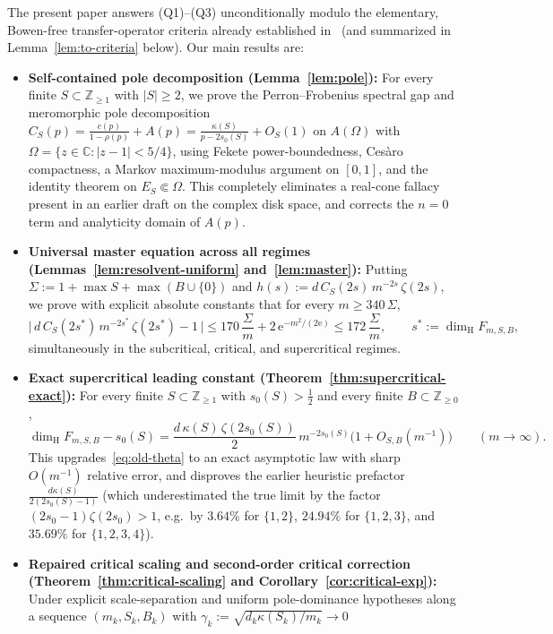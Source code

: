 \documentclass[11pt]{article}
\theoremstyle{definition}
\theoremstyle{remark}
\newcommand{\Z}{\mathbb{Z}}
\newcommand{\C}{\mathbb{C}}
\newcommand{\ee}{\mathrm{e}}
\newcommand{\dimH}{\dim_{\mathrm{H}}}
\begin{document}
The present paper answers (Q1)--(Q3) unconditionally modulo the elementary,
Bowen-free transfer-operator criteria already established in~\cite{Paper2}
(and summarized in Lemma~\ref{lem:to-criteria} below). Our main results are:
\begin{itemize}[leftmargin=1.6em]
\item \textbf{Self-contained pole decomposition (Lemma~\ref{lem:pole}):}
For every finite $S\subset\Z_{\ge1}$ with $|S|\ge2$, we prove the
Perron--Frobenius spectral gap and meromorphic pole decomposition
$C_S(p)=\frac{c(p)}{1-\rho(p)}+A(p)=\frac{\kappa(S)}{p-2s_0(S)}+O_S(1)$ on
$A(\Omega)$ with $\Omega=\{z\in\C:|z-1|<5/4\}$, using Fekete
power-boundedness, Ces\`aro compactness, a Markov maximum-modulus argument on
$[0,1]$, and the identity theorem on $E_S\Subset\Omega$. This completely
eliminates a real-cone fallacy present in an earlier draft on the complex
disk space, and corrects the $n=0$ term and analyticity domain of $A(p)$.
\item \textbf{Universal master equation across all regimes
(Lemmas~\ref{lem:resolvent-uniform} and~\ref{lem:master}):}
Putting $\Sigma:=1+\max S+\max(B\cup\{0\})$ and
$h(s):=d\,C_S(2s)\,m^{-2s}\,\zeta(2s)$, we prove with explicit absolute
constants that for every $m\ge 340\,\Sigma$,
\[
\bigl|\,d\,C_S(2s^*)\,m^{-2s^*}\,\zeta(2s^*)-1\,\bigr|
\le 170\,\frac{\Sigma}{m}+2\,\ee^{-m^2/(2\ee)}
\le 172\,\frac{\Sigma}{m},
\qquad s^*:=\dimH F_{m,S,B},
\]
simultaneously in the subcritical, critical, and supercritical regimes.
\item \textbf{Exact supercritical leading constant
(Theorem~\ref{thm:supercritical-exact}):}
For every finite $S\subset\Z_{\ge1}$ with $s_0(S)>\tfrac12$ and every finite
$B\subset\Z_{\ge0}$,
\[
\dimH F_{m,S,B}-s_0(S)
=\frac{d\,\kappa(S)\,\zeta(2s_0(S))}{2}\,m^{-2s_0(S)}
\bigl(1+O_{S,B}(m^{-1})\bigr)
\qquad(m\to\infty).
\]
This upgrades~\eqref{eq:old-theta} to an exact asymptotic law with sharp
$O(m^{-1})$ relative error, and disproves the earlier heuristic prefactor
$\frac{d\kappa(S)}{2(2s_0(S)-1)}$ (which underestimated the true limit by the
factor $(2s_0-1)\zeta(2s_0)>1$, e.g.\ by $3.64\%$ for $\{1,2\}$, $24.94\%$
for $\{1,2,3\}$, and $35.69\%$ for $\{1,2,3,4\}$).
\item \textbf{Repaired critical scaling and second-order critical correction
(Theorem~\ref{thm:critical-scaling} and Corollary~\ref{cor:critical-exp}):}
Under explicit scale-separation and uniform pole-dominance hypotheses along
a sequence $(m_k,S_k,B_k)$ with $\gamma_k:=\sqrt{d_k\kappa(S_k)/m_k}\to0$

\end{itemize}
\end{document}
